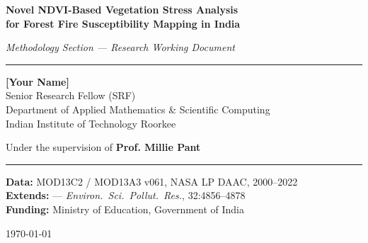 \documentclass[12pt, a4paper]{article}
\begin{document}

\begin{titlepage}
\centering
\vspace*{2cm}

{\LARGE \bfseries Novel NDVI-Based Vegetation Stress Analysis\\[0.5em]
for Forest Fire Susceptibility Mapping in India}

\vspace{1.5cm}

{\large \textit{Methodology Section — Research Working Document}}

\vspace{1cm}

\rule{0.8\linewidth}{0.4pt}

\vspace{1cm}

{\large \textbf{[Your Name]}}\\[0.3em]
{\normalsize Senior Research Fellow (SRF)}\\[0.2em]
{\normalsize Department of Applied Mathematics \& Scientific Computing}\\[0.2em]
{\normalsize Indian Institute of Technology Roorkee}

\vspace{0.5cm}

{\normalsize Under the supervision of \textbf{Prof. Millie Pant}}

\vspace{1cm}

\rule{0.8\linewidth}{0.4pt}

\vspace{0.8cm}

{\normalsize \textbf{Data:} MOD13C2 / MOD13A3 v061, NASA LP DAAC, 2000--2022}\\[0.3em]
{\normalsize \textbf{Extends:} \citealt{biswas2025} —
             \textit{Environ.\ Sci.\ Pollut.\ Res.}, 32:4856--4878}\\[0.3em]
{\normalsize \textbf{Funding:} Ministry of Education, Government of India}

\vspace{1.5cm}

{\normalsize \today}

\end{titlepage}

\tableofcontents
\newpage
\end{document}
